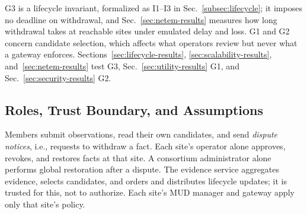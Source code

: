 \documentclass[journal]{IEEEtran}
\theoremstyle{definition}
\begin{document}
G3 is a lifecycle invariant, formalized as I1--I3 in Sec.~\ref{subsec:lifecycle}; it imposes no deadline on withdrawal, and Sec.~\ref{sec:netem-results} measures how long withdrawal takes at reachable sites under emulated delay and loss. G1 and G2 concern candidate selection, which affects what operators review but never what a gateway enforces. Sections~\ref{sec:lifecycle-results}, \ref{sec:scalability-results}, and~\ref{sec:netem-results} test G3, Sec.~\ref{sec:utility-results} G1, and Sec.~\ref{sec:security-results} G2.

\subsection{Roles, Trust Boundary, and Assumptions}
\label{subsec:trust}
Members submit observations, read their own candidates, and send \emph{dispute notices}, i.e., requests to withdraw a fact. Each site's operator alone approves, revokes, and restores facts at that site. A consortium administrator alone performs global restoration after a dispute. The evidence service aggregates evidence, selects candidates, and orders and distributes lifecycle updates; it is trusted for this, not to authorize. Each site's MUD manager and gateway apply only that site's policy.
\end{document}
